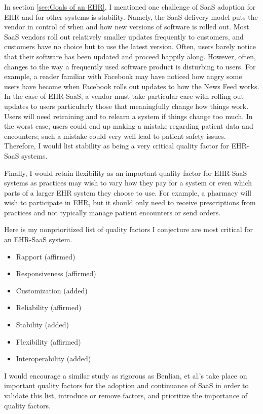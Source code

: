 \documentclass[10pt]{article}
\begin{document}
In section \ref{sec:Goals of an EHR}, I mentioned one challenge of SaaS adoption for EHR and for other systems is stability.
Namely, the SaaS delivery model puts the vendor in control of when and how new versions of software is rolled out.
Most SaaS vendors roll out relatively smaller updates frequently to customers, and customers have no choice but to use the latest version.
Often, users barely notice that their software has been updated and proceed happily along.
However, often, changes to the way a frequently used software product is disturbing to users.
For example, a reader familiar with Facebook may have noticed how angry some users have become when Facebook rolls out updates to how the News Feed works.
In the case of EHR-SaaS, a vendor must take particular care with rolling out updates to users particularly those that meaningfully change how things work.
Users will need retraining and to relearn a system if things change too much.
In the worst case, users could end up making a mistake regarding patient data and encounters;
such a mistake could very well lead to patient safety issues.
Therefore, I would list stability as being a very critical quality factor for EHR-SaaS systems.

Finally, I would retain flexibility as an important quality factor for EHR-SaaS systems as practices may wish to vary how they pay for a system or even which parts of a larger EHR system they choose to use.
For example, a pharmacy will wish to participate in EHR, but it should only need to receive prescriptions from practices and not typically manage patient encounters or send orders.

Here is my nonprioritized list of quality factors I conjecture are most critical for an EHR-SaaS system.
\begin{itemize}
	\item Rapport (affirmed) 
	\item Responsiveness (affirmed)
	\item Customization (added)
	\item Reliability (affirmed)
	\item Stability (added)
	\item Flexibility (affirmed)
	\item Interoperability (added)
\end{itemize}

I would encourage a similar study as rigorous as Benlian, et al.'s take place on important quality factors for the adoption and continuance of SaaS in order to validate this list, introduce or remove factors, and prioritize the importance of quality factors.
\end{document}
